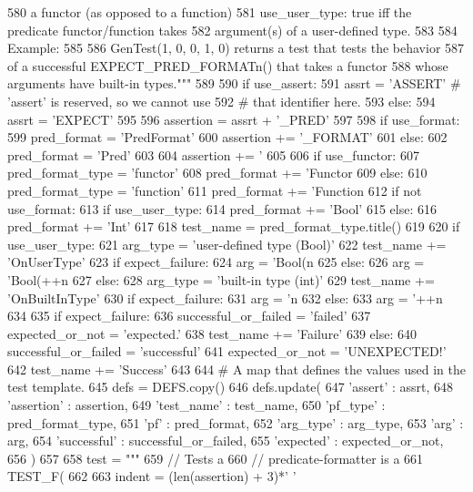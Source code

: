\begin{DoxyCode}
580                       a functor (as opposed to a function)
581       use_user_type:  true iff the predicate functor/function takes
582                       argument(s) of a user-defined type.
583 
584     Example:
585 
586       GenTest(1, 0, 0, 1, 0) returns a test that tests the behavior
587       of a successful EXPECT_PRED_FORMATn() that takes a functor
588       whose arguments have built-in types."""
589 
590     if use_assert:
591       assrt = 'ASSERT'  # 'assert' is reserved, so we cannot use
592                         # that identifier here.
593     else:
594       assrt = 'EXPECT'
595 
596     assertion = assrt + '_PRED'
597 
598     if use_format:
599       pred_format = 'PredFormat'
600       assertion += '_FORMAT'
601     else:
602       pred_format = 'Pred'
603 
604     assertion += '%
605 
606     if use_functor:
607       pred_format_type = 'functor'
608       pred_format += 'Functor%
609     else:
610       pred_format_type = 'function'
611       pred_format += 'Function%
612       if not use_format:
613         if use_user_type:
614           pred_format += 'Bool'
615         else:
616           pred_format += 'Int'
617 
618     test_name = pred_format_type.title()
619 
620     if use_user_type:
621       arg_type = 'user-defined type (Bool)'
622       test_name += 'OnUserType'
623       if expect_failure:
624         arg = 'Bool(n%
625       else:
626         arg = 'Bool(++n%
627     else:
628       arg_type = 'built-in type (int)'
629       test_name += 'OnBuiltInType'
630       if expect_failure:
631         arg = 'n%
632       else:
633         arg = '++n%
634 
635     if expect_failure:
636       successful_or_failed = 'failed'
637       expected_or_not = 'expected.'
638       test_name +=  'Failure'
639     else:
640       successful_or_failed = 'successful'
641       expected_or_not = 'UNEXPECTED!'
642       test_name +=  'Success'
643 
644     # A map that defines the values used in the test template.
645     defs = DEFS.copy()
646     defs.update({
647       'assert' : assrt,
648       'assertion' : assertion,
649       'test_name' : test_name,
650       'pf_type' : pred_format_type,
651       'pf' : pred_format,
652       'arg_type' : arg_type,
653       'arg' : arg,
654       'successful' : successful_or_failed,
655       'expected' : expected_or_not,
656       })
657 
658     test = """
659 // Tests a %
660 // predicate-formatter is a %
661 TEST_F(%
662 
663     indent = (len(assertion) + 3)*' '

\end{DoxyCode}
